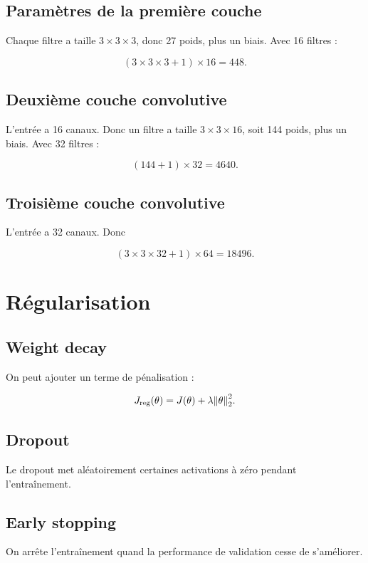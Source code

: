 \documentclass[11pt,a4paper]{article}
\begin{document}
\subsection{Paramètres de la première couche}

Chaque filtre a taille $3 \times 3 \times 3$, donc 27 poids, plus un biais. Avec 16 filtres :

\[
(3 \times 3 \times 3 + 1) \times 16 = 448.
\]

\subsection{Deuxième couche convolutive}

L'entrée a 16 canaux. Donc un filtre a taille $3\times 3\times 16$, soit 144 poids, plus un biais. Avec 32 filtres :

\[
(144 + 1) \times 32 = 4640.
\]

\subsection{Troisième couche convolutive}

L'entrée a 32 canaux. Donc

\[
(3 \times 3 \times 32 + 1) \times 64 = 18496.
\]

\section{Régularisation}

\subsection{Weight decay}

On peut ajouter un terme de pénalisation :

\[
J_{\mathrm{reg}}(\theta) = J(\theta) + \lambda \norm{\theta}_2^2.
\]

\subsection{Dropout}

Le dropout met aléatoirement certaines activations à zéro pendant l'entraînement.

\subsection{Early stopping}

On arrête l'entraînement quand la performance de validation cesse de s'améliorer.
\end{document}
